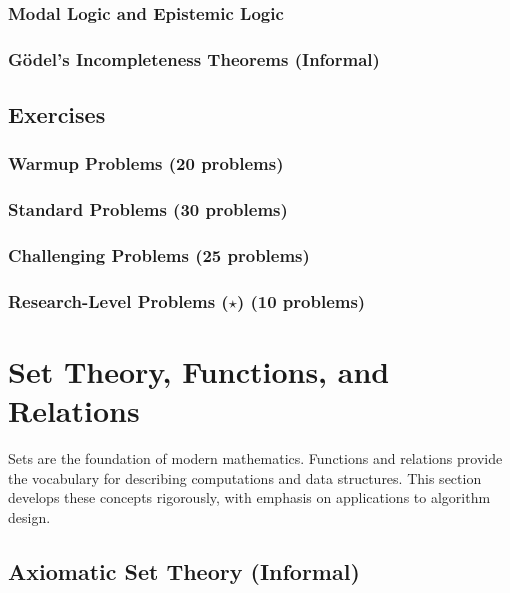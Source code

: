 \subsubsection{Modal Logic and Epistemic Logic}
\subsubsection{Gödel's Incompleteness Theorems (Informal)}

\subsection{Exercises}
\label{subsec:logic-exercises}

\subsubsection{Warmup Problems (20 problems)}
\subsubsection{Standard Problems (30 problems)}
\subsubsection{Challenging Problems (25 problems)}
\subsubsection{Research-Level Problems ($\star$) (10 problems)}

\section{Set Theory, Functions, and Relations}
\label{sec:set-theory}

\begin{sectionintro}
Sets are the foundation of modern mathematics. Functions and relations provide 
the vocabulary for describing computations and data structures. This section 
develops these concepts rigorously, with emphasis on applications to algorithm 
design.
\end{sectionintro}

\subsection{Axiomatic Set Theory (Informal)}
\label{subsec:axiomatic-sets}

